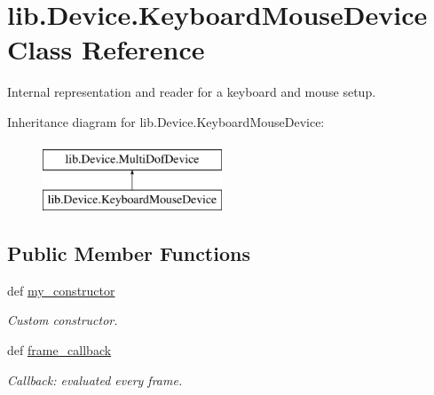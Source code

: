 \hypertarget{classlib_1_1Device_1_1KeyboardMouseDevice}{\section{lib.\-Device.\-Keyboard\-Mouse\-Device \-Class \-Reference}
\label{classlib_1_1Device_1_1KeyboardMouseDevice}
}


\-Internal representation and reader for a keyboard and mouse setup.  


\-Inheritance diagram for lib.\-Device.\-Keyboard\-Mouse\-Device\-:\begin{figure}[H]
\begin{center}
\leavevmode
\includegraphics[height=2.000000cm]{classlib_1_1Device_1_1KeyboardMouseDevice}
\end{center}
\end{figure}
\subsection*{\-Public \-Member \-Functions}
\begin{DoxyCompactItemize}
\item 
def \hyperlink{classlib_1_1Device_1_1KeyboardMouseDevice_ad6f17d93cfb5607f109083150b9f6f93}{my\-\_\-constructor}
\begin{DoxyCompactList}\small\item\em \-Custom constructor. \end{DoxyCompactList}\item 
def \hyperlink{classlib_1_1Device_1_1KeyboardMouseDevice_aaf444ea91368b9310267c9456c18b271}{frame\-\_\-callback}
\begin{DoxyCompactList}\small\item\em \-Callback\-: evaluated every frame. \end{DoxyCompactList}\end{DoxyCompactItemize}
